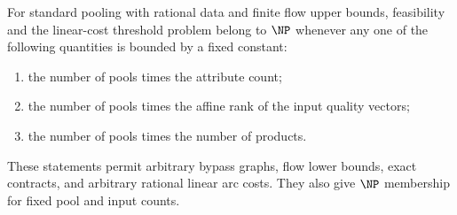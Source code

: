 \begin{corollary}\label{s2:pooling-np}
For standard pooling with rational data and finite flow upper bounds,
feasibility and the linear-cost threshold problem belong to $\NP$
whenever any one of the following quantities is bounded by a fixed
constant:
\begin{enumerate}[label=(\roman*)]
 \item the number of pools times the attribute count;
 \item the number of pools times the affine rank of the input quality
 vectors;
 \item the number of pools times the number of products.
\end{enumerate}
These statements permit arbitrary bypass graphs, flow lower bounds,
exact contracts, and arbitrary rational linear arc costs. They also
give $\NP$ membership for fixed pool and input counts.
\end{corollary}
